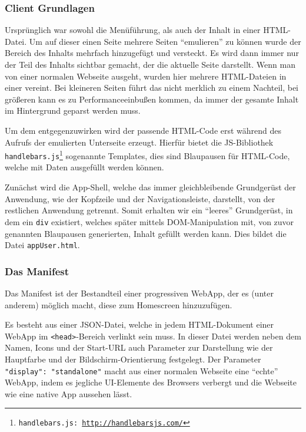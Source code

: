 \documentclass[a4paper,12pt,ngerman,listof=numbered]{scrartcl}      %
\providecommand{\inlinecode}[1]{\texttt{#1}}
\begin{document}
	\subsubsection{Client Grundlagen}
	Ursprünglich war sowohl die Me\-nü\-füh\-rung, als auch der Inhalt in einer HTML-Datei. Um auf dieser einen Seite mehrere Seiten ``emulieren'' zu können wurde der Bereich des Inhalts mehrfach hinzugefügt und versteckt. Es wird dann immer nur der Teil des Inhalts sichtbar gemacht, der die aktuelle Seite darstellt. Wenn man von einer normalen Webseite ausgeht, wurden hier mehrere HTML-Dateien in einer vereint. Bei kleineren Seiten führt das nicht merklich zu einem Nachteil, bei größeren kann es zu Performanceeinbußen kommen, da immer der gesamte Inhalt im Hintergrund geparst werden muss.\par
	Um dem entgegenzuwirken wird der passende HTML-Code erst während des Aufrufs der emulierten Unterseite erzeugt. Hierfür bietet die JS-Bibliothek \inlinecode{handle\-bars.js\footnote{\inlinecode{handlebars.js}: \url{http://handlebarsjs.com/}}} sogenannte Templates, dies sind Blaupausen für HTML-Code, welche mit Daten ausgefüllt werden können.\par
	Zunächst wird die App-Shell, welche das immer gleichbleibende Grundgerüst der Anwendung, wie der Kopfzeile und der Navigations\-leiste, darstellt, von der restlichen Anwendung getrennt. Somit erhalten wir ein ``leeres'' Grundgerüst, in dem ein \inlinecode{div} existiert, welches später mittels DOM-Manipulation mit, von zuvor genannten Blaupausen generierten, Inhalt gefüllt werden kann. Dies bildet die Datei \inlinecode{appUser.html}.\par
	
	\subsubsection{Das Manifest}
	Das Manifest ist der Bestandteil einer progressiven WebApp, der es (unter anderem) möglich macht, diese zum Homescreen hinzuzufügen.\par
	Es besteht aus einer JSON-Datei, welche in jedem HTML-Dokument einer WebApp im \inlinecode{<head>}-Bereich verlinkt sein muss. In dieser Datei werden neben dem Namen, Icons und der Start-URL auch Parameter zur Darstellung wie der Hauptfarbe und der Bildschirm-Orientierung festgelegt. Der Parameter \inlinecode{"{}display"{}: "{}stand\-alone"{}} macht aus einer normalen Webseite eine ``echte'' WebApp, indem es jegliche UI-Elemente des Browsers verbergt und die Webseite wie eine native App aussehen lässt.\par
	
\end{document}
